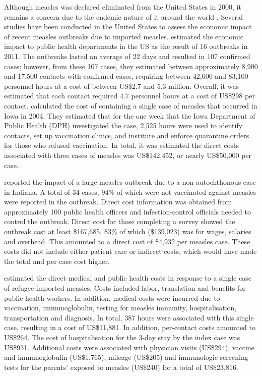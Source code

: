 \documentclass{article}
\begin{document}
Although measles was declared eliminated from the United States in 2000, it remains a concern due to the endemic nature of it around the world \citep{parker6}. Several studies have been conducted in the United States to assess the economic impact of recent measles outbreaks due to imported measles.  \citep{ortegasanchez14} estimated the economic impact to public health departments in the US as the result of 16 outbreaks in 2011. The outbreaks lasted an average of 22 days and resulted in 107 confirmed cases; however, from these 107 cases, they estimated between approximately 8,900 and 17,500 contacts with confirmed cases, requiring between 42,600 and 83,100 personnel hours at a cost of between US\$2.7 and 5.3 million. Overall, it was estimated that each contact required 4.7 personnel hours at a cost of US\$298 per contact.
\citep{dayan5} calculated the cost of containing a single case of measles that occurred in Iowa in 2004. They estimated that for the one week that the Iowa Department of Public Health (DPH) investigated the case, 2,525 hours were used to identify contacts, set up vaccination clinics, and institute and enforce quarantine orders for those who refused vaccination. In total, it was estimated the direct costs associated with three cases of measles was US\$142,452, or nearly US\$50,000 per case.

\citep{parker6} reported the impact of a large measles outbreak due to a non-autochthonous case in Indiana. A total of 34 cases, 94\% of which were not vaccinated against measles were reported in the outbreak. Direct cost information was obtained from approximately 100 public health officers and infection-control officials needed to control the outbreak. Direct cost for those completing a survey showed the outbreak cost at least \$167,685, 83\% of which (\$139,023) was for wages, salaries and overhead. This amounted to a direct cost of \$4,932 per measles case. These costs did not include either patient care or indirect costs, which would have made the total and per case cost higher.

\citep{coleman12} estimated the direct medical and public health costs in response to a single case of refugee-imported measles.  Costs included labor, translation and benefits for public health workers. In addition, medical costs were incurred due to vaccination, immunoglobulin, testing for measles immunity, hospitalisation, transportation and diagnosis. In total, 387 hours were associated with this single case, resulting in a cost of US\$11,881. In addition, per-contact costs amounted to US\$264. The cost of hospitalisation for the 3-day stay by the index case was US\$931. Additional costs were associated with physician visits (US\$294), vaccine and immunoglobulin (US\$1,765), mileage (US\$205) and immunologic screening tests for the parents' exposed to measles (US\$240) for a total of US\$23,816.
\end{document}
